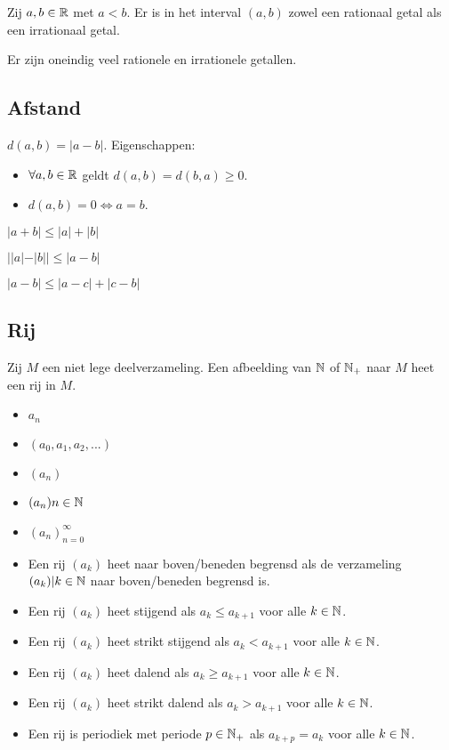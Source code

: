\documentclass[week=1]{homework}
\begin{document}
	\Stel Zij $a,b \in \mathbb{R}$ met $a < b$. Er is in het interval $(a,b)$ zowel een rationaal getal als een irrationaal getal. 
	
	\Gevolg Er zijn oneindig veel rationele en irrationele getallen. 
	
	\subsection*{Afstand}
	\Def $d(a,b) = |a-b|$. Eigenschappen:
	\begin{itemize}
		\item $\forall a,b \in \mathbb{R}$ geldt $d(a,b) = d(b,a) \ge 0$. 
		\item $d(a,b) = 0 \Leftrightarrow a = b$.
	\end{itemize}
	
	\Stel[Driehoeksongelijkheid] $|a+b| \le |a| + |b|$
	
	 $| |a| - |b| | \le |a-b|$
	
	\Stel $|a-b| \le |a-c| + |c-b|$
	
	\subsection*{Rij}
	\Def[Rij] Zij $M$ een niet lege deelverzameling. Een afbeelding van $\mathbb{N}$ of $\mathbb{N}_+$ naar $M$ heet een rij in $M$. 
	
	\Not \begin{itemize}
		\item $a_n$
		\item $(a_0, a_1, a_2, ...)$
		\item $(a_n)$
		\item $(a_n)n \in \mathbb{N}$
		\item $(a_n)_{n=0}^\infty$
	\end{itemize}
	
	\Def \begin{itemize}
		\item Een rij $(a_k)$ heet naar boven/beneden begrensd als de verzameling ${(a_k)|k \in \mathbb{N}}$ naar boven/beneden begrensd is. 
		\item Een rij $(a_k)$ heet stijgend als $a_k \le a_{k+1}$ voor alle $k \in \mathbb{N}$. 
		\item Een rij $(a_k)$ heet strikt stijgend als $a_k < a_{k+1}$ voor alle $k \in \mathbb{N}$. 
		\item Een rij $(a_k)$ heet dalend als $a_k \ge a_{k+1}$ voor alle $k \in \mathbb{N}$. 
		\item Een rij $(a_k)$ heet strikt dalend als $a_k > a_{k+1}$ voor alle $k \in \mathbb{N}$.
		\item Een rij is periodiek met periode $p \in \mathbb{N}_+$ als $a_{k+p} = a_k$ voor alle $k \in \mathbb{N}$.
	\end{itemize}
	
\end{document}
